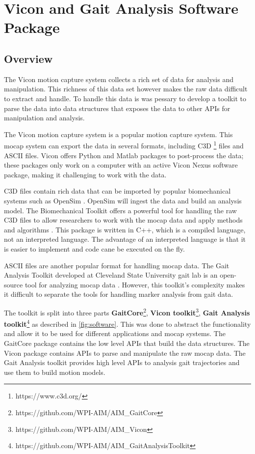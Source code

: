 
\chapter{Vicon and Gait Analysis Software Package}
\label{chap:software}
\section{Overview}
The Vicon motion capture system collects a rich set of data for analysis and manipulation. This richness of this data set however makes the raw data difficult to extract and handle.
To handle this data is was pessary to develop a toolkit to parse the data into data structures that exposes the data to other APIs for manipulation and analysis. 

The Vicon  motion capture system is a popular motion capture system. This mocap system can export the data in several formats, including C3D \footnote{https://www.c3d.org/}  files and ASCII files. Vicon offers Python and Matlab packages to post-process the data; these packages only work on a computer with an active Vicon Nexus software package, making it challenging to work with the data. 

C3D files contain rich data that can be imported by popular biomechanical systems such as OpenSim \cite{seth2018opensim}. OpenSim will ingest the data and build an analysis model. The Biomechanical Toolkit offers a powerful tool for handling the raw C3D files to allow researchers to work with the mocap data and apply methods and algorithms \cite{barre2014biomechanical}. This package is written in C++, which is a compiled language, not an interpreted language. The advantage of an  interpreted language is that it is easier to implement and code cane be executed on the fly.

ASCII files are another popular format for handling mocap data. The Gait Analysis Toolkit developed at Cleveland State University gait lab is an open-source tool for analyzing mocap data  \cite{DTK2014} \cite{GATK2014}. However, this toolkit's complexity makes it difficult to separate the tools for handling marker analysis from gait data.   

The toolkit is split into three parts \textbf{GaitCore}\footnote{https://github.com/WPI-AIM/AIM\_GaitCore}, \textbf{Vicon toolkit}\footnote{https://github.com/WPI-AIM/AIM\_Vicon},  \textbf{Gait Analysis toolkit}\footnote{https://github.com/WPI-AIM/AIM\_GaitAnalysisToolkit} as described in \autoref{fig:software}. This was done to abstract the functionality and allow it to be used for different applications and mocap systems. The GaitCore package contains the low level APIs that build the data structures. The Vicon package contains APIs to parse and manipulate the raw mocap data. The Gait Analysis toolkit provides high level APIs to analysis gait trajectories and use them to build motion models. 

